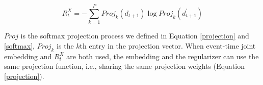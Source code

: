 \documentclass{article} %
\begin{document}
\begin{equation}
    R_{t}^X=-\sum_{k=1}^{P}{Proj_{k}(d_{t+1})\log{Proj_{k}(d_{t+1}^\prime)}}
\end{equation}

$Proj$ is the softmax projection process we defined in Equation \ref{projection} and \ref{softmax}, $Proj_{k}$ is the $k$th entry in the projection vector. When event-time joint embedding and $R_{t}^X$ are both used, the embedding and the regularizer can use the same projection function, i.e., sharing the same projection weights (Equation \ref{projection}).





\end{document}
